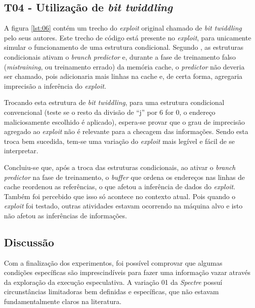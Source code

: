 \documentclass[
	article,			    %
	12pt,				    %
	oneside,			    %
	a4paper,			    %
	chapter=TITLE,		    %
	section=TITLE,		    %
	subsection=TITLE,	    %
	english,			    %
	brazil,				    %
	sumario=tradicional
]{abntex2}
\begin{document}
\begin{comment}
Adicionar uma imagem com as saídas.
\end{comment}

\subsection{T04 - Utilização de \emph{bit twiddling}}
A figura \ref{lst:06} contém um trecho do \emph{exploit} original chamado de \emph{bit twiddling} pelo seus autores. Este trecho de código está presente no \emph{exploit}, para unicamente simular o funcionamento de uma estrutura condicional. Segundo , as estruturas condicionais ativam o \emph{branch predictor} e, durante a fase de treinamento falso (\emph{mistraining}, ou treinamento errado) da memória cache, o \emph{predictor} não deveria ser chamado, pois adicionaria mais linhas na cache e, de certa forma, agregaria imprecisão a inferência do \emph{exploit}.



Trocando esta estrutura de \emph{bit twiddling}, para uma estrutura condicional convencional (teste se o resto da divisão de ``j'' por 6 for 0, o endereço maliciosamente escolhido é aplicado), espera-se provar que o grau de imprecisão agregado ao \emph{exploit} não é relevante para a checagem das informações. Sendo esta troca bem sucedida, tem-se uma variação do \emph{exploit} mais legível e fácil de se interpretar.

Concluiu-se que, após a troca das estruturas condicionais, ao ativar o \emph{branch predictor} na fase de treinamento, o \emph{buffer} que ordena os endereços nas linhas de cache reordenou as referências, o que afetou a inferência de dados do \emph{exploit}. Também foi percebido que isso só acontece no contexto atual. Pois quando o \emph{exploit} foi testado, outras atividades estavam ocorrendo na máquina alvo e isto não afetou as inferências de informações.

\subsection{Discussão}
Com a finalização dos experimentos, foi possível comprovar que algumas condições específicas são imprescindíveis para fazer uma informação vazar através da exploração da execução especulativa. A variação 01 da \emph{Spectre} possuí circunstâncias limitadoras bem definidas e específicas, que não estavam fundamentalmente claros na literatura.
\end{document}
